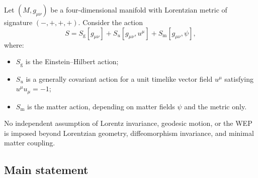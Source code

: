 \documentclass[12pt,a4paper]{article}
\newcommand{\EH}{S_{\mathrm{g}}}
\newcommand{\Su}{S_{u}}
\newcommand{\Sm}{S_{\mathrm{m}}}
\begin{document}
            Let $(M,g_{\mu\nu})$ be a four-dimensional manifold with Lorentzian metric of
            signature $(-,+,+,+)$. Consider the action
            \begin{equation}
                S=\EH[g_{\mu\nu}] + \Su[g_{\mu\nu},u^\mu] + \Sm[g_{\mu\nu},\psi],
                \label{eq:total_action}
            \end{equation}
            where:
            \begin{itemize}[noitemsep]
\item $\EH$ is the Einstein--Hilbert action;
\item $\Su$ is a generally covariant action for a unit timelike vector field
$u^\mu$ satisfying $u^\mu u_\mu=-1$;
\item $\Sm$ is the matter action, depending on matter fields $\psi$ and the
metric only.
            \end{itemize}
            No independent assumption of Lorentz invariance, geodesic motion, or the WEP
            is imposed beyond Lorentzian geometry, diffeomorphism invariance, and minimal
            matter coupling.
        
        \subsection{Main statement}
            
\end{document}
